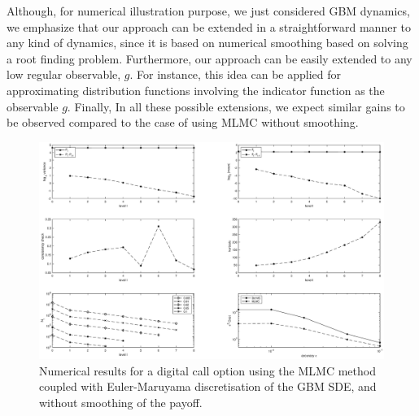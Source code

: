 Although, for numerical illustration purpose, we just considered GBM dynamics, we emphasize that our approach can be extended in a straightforward manner to any kind of dynamics, since it is based on numerical smoothing based on solving a root finding problem. Furthermore, our approach can be easily extended to any low regular observable, $g$. For instance, this idea can be applied for approximating distribution functions involving the indicator function as the observable $g$. Finally, In all these possible extensions, we expect similar gains to be observed compared   to the case of using MLMC without smoothing.
\FloatBarrier
	\begin{figure}[h!]
\centering
\includegraphics[width=0.7\linewidth]{./figures/MLMC_binary_opt/euler_digital_without_smoothing}

\caption{Numerical results for a digital call option using the MLMC method coupled with Euler-Maruyama discretisation of the GBM SDE, and without smoothing of the payoff.}
\label{fig:euler_digital_without_smoothing}
\end{figure}

